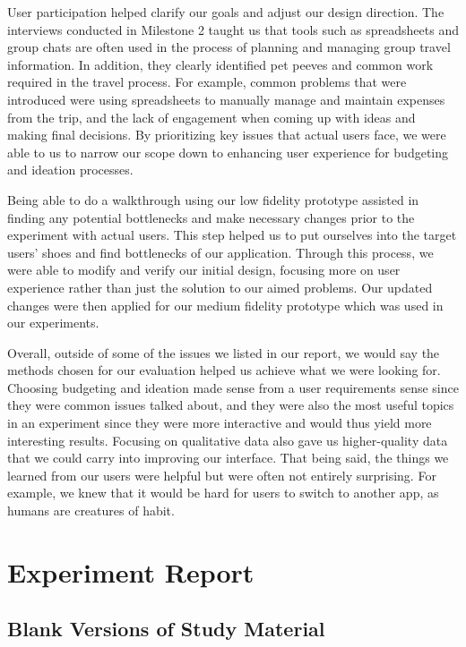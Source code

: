\documentclass[12pt,a4paper]{article}
\begin{document}
User participation helped clarify our goals and adjust our design direction. The interviews conducted in Milestone 2 taught us that tools such as spreadsheets and group chats are often used in the process of planning and managing group travel information. In addition, they clearly identified pet peeves and common work required in the travel process. For example, common problems that were introduced were using spreadsheets to manually manage and maintain expenses from the trip, and the lack of engagement when coming up with ideas and making final decisions. By prioritizing key issues that actual users face, we were able to us to narrow our scope down to enhancing user experience for budgeting and ideation processes. 
\newline

Being able to do a walkthrough using our low fidelity prototype assisted in finding any potential bottlenecks and make necessary changes prior to the experiment with actual users. This step helped us to put ourselves into the target users' shoes and find bottlenecks of our application. Through this process, we were able to modify and verify our initial design, focusing more on user experience rather than just the solution to our aimed problems. Our updated changes were then applied for our medium fidelity prototype which was used in our experiments. 
\newline 

Overall, outside of some of the issues we listed in our report, we would say the methods chosen for our evaluation helped us achieve what we were looking for. Choosing budgeting and ideation made sense from a user requirements sense since they were common issues talked about, and they were also the most useful topics in an experiment since they were more interactive and would thus yield more interesting results. Focusing on qualitative data also gave us higher-quality data that we could carry into improving our interface. That being said, the things we learned from our users were helpful but were often not entirely surprising. For example, we knew that it would be hard for users to switch to another app, as humans are creatures of habit.

\newpage

\appendix
\section{Experiment Report}
\subsection{Blank Versions of Study Material}
\end{document}
